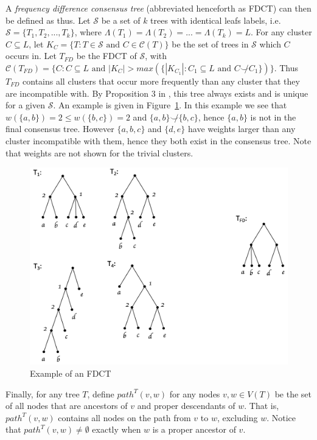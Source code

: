 \documentclass{article}
\newcommand{\compatible}{\smile}
\newcommand{\leafset}{\Lambda}
\begin{document}
    A \textit{frequency difference consensus tree} (abbreviated henceforth as FDCT) can then be defined as thus. Let $\mathcal{S}$ be a set of $k$ trees with identical leafs labels, i.e. $\mathcal{S} = \{T_1, T_2, ..., T_k\}$, where $\leafset(T_1) = \leafset(T_2) = ... = \leafset(T_k) = L$. For any cluster $C \subseteq L$, let $K_C = \{T : T \in \mathcal{S} \text{ and } C \in \mathcal{C}(T)\}$ be the set of trees in $\mathcal{S}$ which $C$ occurs in. Let $T_{FD}$ be the FDCT of $\mathcal{S}$, with $\mathcal{C}(T_{FD}) = \{C : C \subseteq L \text{ and } |K_C| > max(\{|K_{C_1}| : C_1 \subseteq L \text{ and } C \not\compatible C_1\})\}$. Thus $T_{FD}$ contains all clusters that occur more frequently than any cluster that they are incompatible with. By Proposition $3$ in \cite{steel2014axiomatic}, this tree always exists and is unique for a given $\mathcal{S}$. An example is given in Figure~\ref{fig:freqdiff}. In this example we see that $w(\{a, b\}) = 2 \leq w(\{b, c\}) = 2$ and $\{a, b\} \not\compatible \{b, c\}$, hence $\{a, b\}$ is not in the final consensus tree. However $\{a, b, c\}$ and $\{d, e\}$ have weights larger than any cluster incompatible with them, hence they both exist in the consensus tree. Note that weights are not shown for the trivial clusters.

    \begin{figure}[h]
        \includegraphics[scale=0.5]{freqdiff}
        \centering
        \caption{Example of an FDCT}
        \label{fig:freqdiff}
    \end{figure}

    Finally, for any tree $T$, define $path^{T}(v, w)$ for any nodes $v, w \in V(T)$ be the set of all nodes that are ancestors of $v$ and proper descendants of $w$. That is, $path^{T}(v, w)$ contains all nodes on the path from $v$ to $w$, excluding $w$. Notice that $path^{T}(v, w) \neq \emptyset$ exactly when $w$ is a proper ancestor of $v$.
\end{document}
